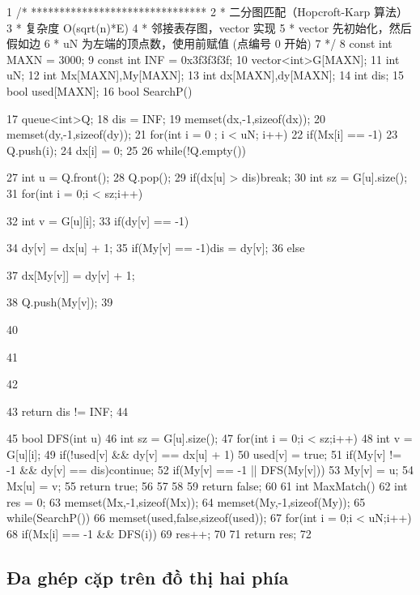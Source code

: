 \documentclass[11pt]{article}
\begin{document}
\begin{Code}
 1   /* *******************************
 2    * 二分图匹配（Hopcroft-Karp 算法）
 3    * 复杂度 O(sqrt(n)*E)
 4    * 邻接表存图，vector 实现
 5    * vector 先初始化，然后假如边
 6    * uN 为左端的顶点数，使用前赋值 (点编号 0 开始)
 7    */
 8   const int MAXN = 3000;
 9   const int INF = 0x3f3f3f3f;
10   vector<int>G[MAXN];
11   int uN;
12   int Mx[MAXN],My[MAXN];
13   int dx[MAXN],dy[MAXN];
14   int dis;
15   bool used[MAXN];
16   bool SearchP(){
17       queue<int>Q;
18       dis = INF;
19       memset(dx,-1,sizeof(dx));
20       memset(dy,-1,sizeof(dy));
21       for(int i = 0 ; i < uN; i++)
22           if(Mx[i] == -1){
23               Q.push(i);
24               dx[i] = 0;
25           }
26       while(!Q.empty()){
27           int u = Q.front();
28           Q.pop();
29           if(dx[u] > dis)break;
30           int sz = G[u].size();
31           for(int i = 0;i < sz;i++){
32               int v = G[u][i];
33               if(dy[v] == -1){
34                    dy[v] = dx[u] + 1;
35                    if(My[v] == -1)dis = dy[v];
36                    else{
37                        dx[My[v]] = dy[v] + 1;


38                       Q.push(My[v]);
39                   }
40               }
41           }
42       }
43       return dis != INF;
44   }
45   bool DFS(int u){
46       int sz = G[u].size();
47       for(int i = 0;i < sz;i++){
48           int v = G[u][i];
49           if(!used[v] && dy[v] == dx[u] + 1){
50               used[v] = true;
51               if(My[v] != -1 && dy[v] == dis)continue;
52               if(My[v] == -1 || DFS(My[v])){
53                    My[v] = u;
54                    Mx[u] = v;
55                    return true;
56               }
57           }
58       }
59       return false;
60   }
61   int MaxMatch(){
62       int res = 0;
63       memset(Mx,-1,sizeof(Mx));
64       memset(My,-1,sizeof(My));
65       while(SearchP()){
66           memset(used,false,sizeof(used));
67           for(int i = 0;i < uN;i++)
68               if(Mx[i] == -1 && DFS(i))
69                    res++;
70       }
71       return res;
72   }
\end{Code}

\subsection{Đa ghép cặp trên đồ thị hai phía}
\end{document}
